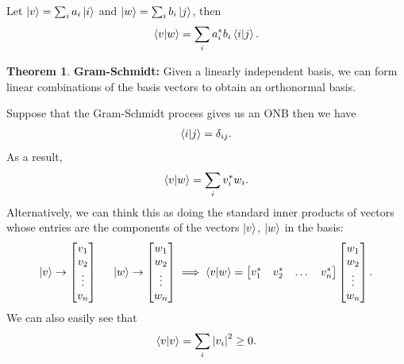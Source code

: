 \documentclass{book}
\theoremstyle{definition}
\newtheorem{thm}{Theorem}[section]
\newcommand{\w}{\omega}
\begin{document}
Let $\ket{v} = \sum_i a_i\ket{i}$ and $\ket{w} = \sum_i b_i \ket{j}$, then 
\begin{align}
\braket{v}{w} = \sum_i a_i^*b_i \braket{i}{j}.
\end{align}



\begin{thm}
	\textbf{Gram-Schmidt:} Given a linearly independent basis, we can form linear combinations of the basis vectors to obtain an orthonormal basis. 
\end{thm}

Suppose that the Gram-Schmidt process gives us an ONB then we have
\begin{align}
\braket{i}{j} = \delta_{ij}.
\end{align}
As a result,
\begin{align}
\braket{v}{w} = \sum_i v_i^*w_i.
\end{align}
Alternatively, we can think this as doing the standard inner products of vectors whose entries are the components of the vectors $\ket{v}$, $\ket{w}$ in the basis:
\begin{align}
\ket{v} \to \begin{bmatrix}
v_1\\v_2\\\vdots\\v_n
\end{bmatrix}\hspace{0.5cm}
\ket{w} \to \begin{bmatrix}
w_1\\w_2\\\vdots\\w_n
\end{bmatrix} \implies \braket{v}{w} = \begin{bmatrix}
v_1^* & v_2^* & \dots & v_n^*
\end{bmatrix}\begin{bmatrix}
w_1\\ w_2 \\\vdots \\ w_n
\end{bmatrix}.
\end{align}
We can also easily see that 
\begin{align}
\braket{v}{v} = \sum_i \abs{v_i}^2 \geq 0.
\end{align}
\end{document}
